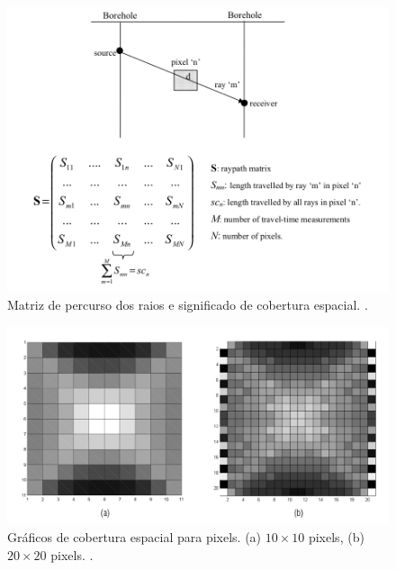 \documentclass[a4paper, 12 pt]{article} %
\begin{document}
\begin{figure}[!hbtp]
	\begin{center}
		\includegraphics[scale=0.50]{Figuras/matriz_convergencia.png}
	\end{center}
	\caption{Matriz de percurso dos raios e significado de cobertura espacial. \cite{RBGf1495}.}
	\label{matriz_convergencia}
\end{figure}

\begin{figure}[!hbtp]
	\begin{center}
		\includegraphics[scale=0.42]{Figuras/raios_convergencia.png}
	\end{center}
	\caption{Gráficos de cobertura espacial para pixels. (a) $10 \times 10$ pixels, (b) $20 \times 20$ pixels. \cite{RBGf1495}.}
	\label{raios_convergencia}
\end{figure} 
\end{document}
